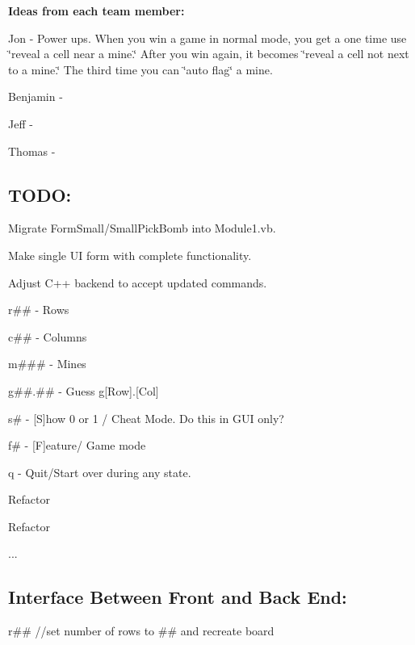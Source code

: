 {\bfseries{Ideas from each team member\+:}}

Jon -\/ Power ups. When you win a game in \textquotesingle{}normal\textquotesingle{} mode, you get a one time use \char`\"{}reveal a cell near a mine.\char`\"{} After you win again, it becomes \char`\"{}reveal a cell not next to a mine.\char`\"{} The third time you can \char`\"{}auto flag\char`\"{} a mine.

Benjamin -\/

Jeff -\/

Thomas -\/

\subsection*{T\+O\+DO\+:}


\begin{DoxyEnumerate}
\item Migrate Form\+Small/\+Small\+Pick\+Bomb into Module1.\+vb.
\item Make single UI form with complete functionality.
\item Adjust C++ backend to accept updated commands.
\begin{DoxyEnumerate}
\item r\#\# -\/ Rows
\item c\#\# -\/ Columns
\item m\#\#\# -\/ Mines
\item g\#\#.\#\# -\/ Guess g\mbox{[}Row\mbox{]}.\mbox{[}Col\mbox{]}
\end{DoxyEnumerate}
\begin{DoxyEnumerate}
\item s\# -\/ \mbox{[}S\mbox{]}how 0 or 1 / Cheat Mode. Do this in G\+UI only?
\item f\# -\/ \mbox{[}F\mbox{]}eature/ Game mode
\item q -\/ Quit/\+Start over during any state.
\end{DoxyEnumerate}
\item Refactor
\item Refactor
\item ...
\end{DoxyEnumerate}

\subsection*{Interface Between Front and Back End\+:}

r\#\# //set number of rows to \#\# and recreate board

